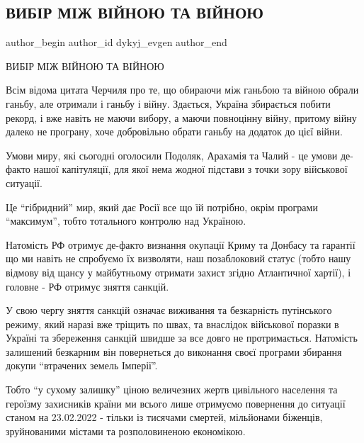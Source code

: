  
 
 
 
 
 
\subsection{ВИБІР МІЖ ВІЙНОЮ ТА ВІЙНОЮ}
\label{sec:29_03_2022.fb.dykyj_evgen.1.vijna_vijna}
 
\ifcmt
 author_begin
   author_id dykyj_evgen
 author_end
\fi

ВИБІР МІЖ ВІЙНОЮ ТА ВІЙНОЮ

Всім відома цитата Черчиля про те, що обираючи між ганьбою та війною обрали
ганьбу, але отримали і ганьбу і війну. Здається, Україна збирається побити
рекорд, і вже навіть не маючи вибору, а маючи повноцінну війну, притому війну
далеко не програну, хоче добровільно обрати ганьбу на додаток до цієї війни. 

Умови миру, які сьогодні оголосили Подоляк, Арахамія та Чалий - це умови
де-факто нашої капітуляції, для якої нема жодної підстави з точки зору
військової ситуації. 

Це \enquote{гібридний} мир, який дає Росії все що їй потрібно, окрім програми
\enquote{максимум}, тобто тотального контролю над Україною. 

Натомість РФ отримує де-факто визнання окупації Криму та Донбасу та гарантії що
ми навіть не спробуємо їх визволяти, наш позаблоковий статус (тобто нашу
відмову від щансу у майбутньому отримати захист згідно Атлантичної хартії), і
головне - РФ отримує зняття санкцій.

У свою чергу зняття санкцій означає виживання та безкарність путінського
режиму, який наразі вже тріщить по швах, та внаслідок військової поразки в
Україні та збереження санкцій швидше за все довго не протримається. Натомість
залишений безкарним він повернеться до виконання своєї програми збирання докупи
\enquote{втрачених земель Імперії}.

Тобто \enquote{у сухому залишку} ціною величезних жертв цивільного населення та
героїзму захисників країни ми всього лише отримуємо повернення до ситуації
станом на 23.02.2022 - тільки із тисячами смертей, мільйонами біженців,
зруйнованими містами та розполовиненою економікою. 

